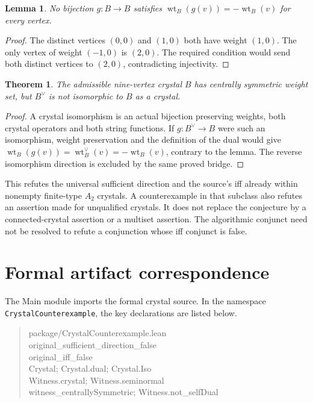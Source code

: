 \documentclass[11pt,a4paper]{article}
\newtheorem{theorem}{Theorem}
\newtheorem{lemma}{Lemma}
\newcommand{\wt}{\operatorname{wt}}
\begin{document}
\begin{lemma}
No bijection $g:B\to B$ satisfies $\wt_B(g(v))=-\wt_B(v)$ for every vertex.
\end{lemma}
\begin{proof}
The distinct vertices $(0,0)$ and $(1,0)$ both have weight $(1,0)$.
The only vertex of weight $(-1,0)$ is $(2,0)$. The required condition would
send both distinct vertices to $(2,0)$, contradicting injectivity.
\end{proof}

\begin{theorem}
The admissible nine-vertex crystal $B$ has centrally symmetric weight set, but
$B^\vee$ is not isomorphic to $B$ as a crystal.
\end{theorem}
\begin{proof}
A crystal isomorphism is an actual bijection preserving weights, both crystal
operators and both string functions. If $g:B^\vee\to B$ were such an
isomorphism, weight preservation and the definition of the dual would give
$\wt_B(g(v))=\wt_B^\vee(v)=-\wt_B(v)$, contrary to the lemma.
The reverse isomorphism direction is excluded by the same proved bridge.
\end{proof}

This refutes the universal sufficient direction and the source's iff already
within nonempty finite-type $A_2$ crystals. A counterexample in that subclass
also refutes an assertion made for unqualified crystals. It does not replace
the conjecture by a connected-crystal assertion or a multiset assertion.
The algorithmic conjunct need not be resolved to refute a conjunction whose
iff conjunct is false.

\section*{Formal artifact correspondence}
The Main module imports the formal crystal source. In the namespace
\texttt{CrystalCounterexample}, the key declarations are listed below.
\begin{quote}\ttfamily\small
package/CrystalCounterexample.lean\\
original\_sufficient\_direction\_false\\
original\_iff\_false\\
Crystal; Crystal.dual; Crystal.Iso\\
Witness.crystal; Witness.seminormal\\
witness\_centrallySymmetric; Witness.not\_selfDual
\end{quote}
\end{document}
